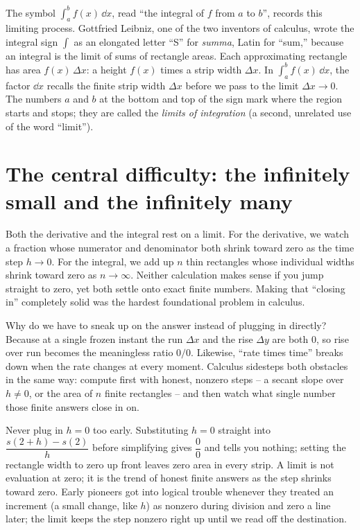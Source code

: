 \begin{happeningbox}
The symbol $\displaystyle\int_a^b f(x)\,\dd x$, read ``the integral of $f$ from $a$
to $b$'', records this limiting process.
Gottfried Leibniz, one of the two inventors of calculus, wrote the integral sign
$\int$ as an elongated letter ``S'' for \emph{summa}, Latin for ``sum,''
because an integral is the limit of sums of rectangle areas. Each approximating rectangle has area
$f(x)\,\Delta x$: a height $f(x)$ times a strip width $\Delta x$. In $\int_a^b f(x)\,\dd x$,
the factor $\dd x$ recalls the finite strip width $\Delta x$ before we pass to the limit $\Delta x \to 0$.
The numbers $a$ and $b$ at the bottom and top of the sign mark where the region starts
and stops; they are called the \emph{limits of integration} (a second, unrelated use
of the word ``limit'').
\end{happeningbox}

\section{The central difficulty: the infinitely small and the infinitely many}

Both the derivative and the integral rest on a limit. For the derivative, we watch a fraction whose
numerator and denominator both shrink toward zero as the time step $h \to 0$. For the integral, we add up $n$ thin rectangles
whose individual widths shrink toward zero as $n \to \infty$. Neither calculation makes sense if you jump straight to zero, yet both settle onto
exact finite numbers. Making that ``closing in'' completely solid was the hardest foundational problem in calculus.

\begin{intuitionbox}
Why do we have to sneak up on the answer instead of plugging in directly? Because at a single frozen instant the run $\Delta x$ and the rise $\Delta y$ are both $0$, so rise over run becomes the meaningless ratio $0/0$. Likewise, ``rate times time'' breaks down when the rate changes at every moment. Calculus sidesteps both obstacles in the same way: compute first with honest, nonzero steps -- a secant slope over $h \neq 0$, or the area of $n$ finite rectangles -- and then watch what single number those finite answers close in on.
\end{intuitionbox}

\begin{trapbox}
Never plug in $h = 0$ too early. Substituting $h = 0$ straight into
$\dfrac{s(2+h)-s(2)}{h}$ before simplifying gives $\dfrac{0}{0}$ and tells you nothing; setting the rectangle width to zero up front leaves zero area in every strip.
A limit is not evaluation at zero; it is the trend of honest finite answers as the step shrinks toward zero. Early pioneers got into logical trouble whenever they treated an increment (a small change, like $h$) as nonzero during division and zero a line later; the limit keeps the step nonzero right up until we read off the destination.
\end{trapbox}

